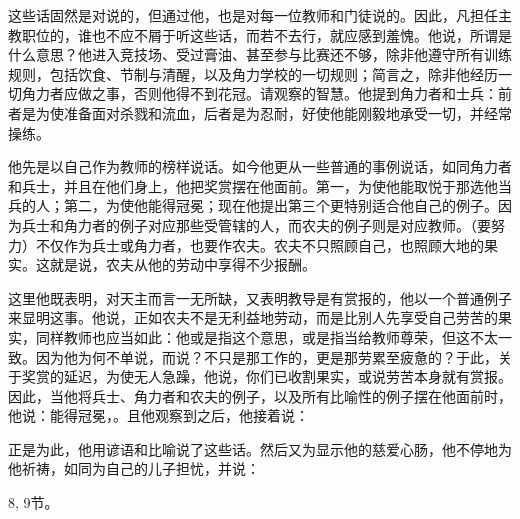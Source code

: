 \par

这些话固然是对说的，但通过他，也是对每一位教师和门徒说的。因此，凡担任主教职位的，谁也不应不屑于听这些话，而若不去行，就应感到羞愧。他说，所谓是什么意思？他进入竞技场、受过膏油、甚至参与比赛还不够，除非他遵守所有训练规则，包括饮食、节制与清醒，以及角力学校的一切规则；简言之，除非他经历一切角力者应做之事，否则他得不到花冠。请观察的智慧。他提到角力者和士兵：前者是为使准备面对杀戮和流血，后者是为忍耐，好使他能刚毅地承受一切，并经常操练。\par

\par

他先是以自己作为教师的榜样说话。如今他更从一些普通的事例说话，如同角力者和兵士，并且在他们身上，他把奖赏摆在他面前。第一，为使他能取悦于那选他当兵的人；第二，为使他能得冠冕；现在他提出第三个更特别适合他自己的例子。因为兵士和角力者的例子对应那些受管辖的人，而农夫的例子则是对应教师。（要努力）不仅作为兵士或角力者，也要作农夫。农夫不只照顾自己，也照顾大地的果实。这就是说，农夫从他的劳动中享得不少报酬。\par

这里他既表明，对天主而言一无所缺，又表明教导是有赏报的，他以一个普通例子来显明这事。他说，正如农夫不是无利益地劳动，而是比别人先享受自己劳苦的果实，同样教师也应当如此：他或是指这个意思，或是指当给教师尊荣，但这不太一致。因为他为何不单说，而说？不只是那工作的，更是那劳累至疲惫的？于此，关于奖赏的延迟，为使无人急躁，他说，你们已收割果实，或说劳苦本身就有赏报。因此，当他将兵士、角力者和农夫的例子，以及所有比喻性的例子摆在他面前时，他说：能得冠冕，。且他观察到之后，他接着说：\par

\par

正是为此，他用谚语和比喻说了这些话。然后又为显示他的慈爱心肠，他不停地为他祈祷，如同为自己的儿子担忧，并说：\par

8, 9节。\par

